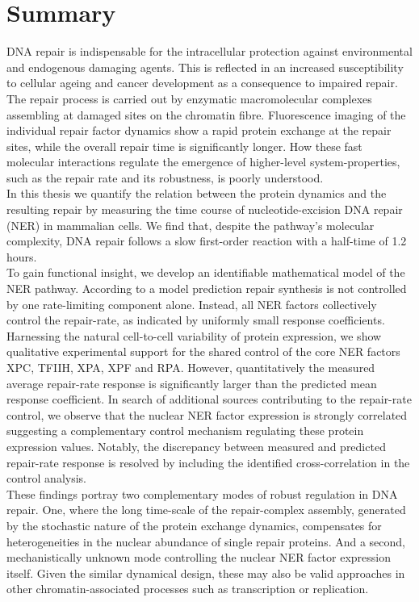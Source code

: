 \chapter*{Summary}
\thispagestyle{plain2}





DNA repair is indispensable for the intracellular protection against environmental and endogenous damaging agents. This is reflected in an increased susceptibility to cellular ageing and cancer development as a consequence to impaired repair. The repair process is carried out by enzymatic macromolecular complexes assembling at damaged sites on the chromatin fibre. Fluorescence imaging of the individual repair factor dynamics show a rapid protein exchange at the repair sites, while the overall repair time is significantly longer. How these fast molecular interactions regulate the emergence of higher-level system-properties, such as the repair rate and its robustness, is poorly understood.\\ 
In this thesis we quantify the relation between the protein dynamics and the resulting repair by measuring the time course of nucleotide-excision DNA repair (NER) in mammalian cells. We find that, despite the pathway's molecular complexity, DNA repair follows a slow first-order reaction with a half-time of 1.2 hours. \\
To gain functional insight, we develop an identifiable mathematical model of the NER pathway. According to a model prediction repair synthesis is not controlled by one rate-limiting component alone. Instead, all NER factors collectively control the repair-rate, as indicated by uniformly small response coefficients. Harnessing the natural cell-to-cell variability of protein expression, we show qualitative experimental support for the shared control of the core NER factors XPC, TFIIH, XPA, XPF and RPA. However, quantitatively the measured average repair-rate response is significantly larger than the predicted mean response coefficient. In search of additional sources contributing to the repair-rate control, we observe that the nuclear NER factor expression is strongly correlated suggesting a complementary control mechanism regulating these protein expression values. Notably, the discrepancy between measured and predicted repair-rate response is resolved by including the identified cross-correlation in the control analysis. \\ 
These findings portray two complementary modes of robust regulation in DNA repair. One, where the long time-scale of the repair-complex assembly, generated by the stochastic nature of the protein exchange dynamics, compensates for heterogeneities in the nuclear abundance of single repair proteins. And a second, mechanistically unknown mode controlling the nuclear NER factor expression itself. Given the similar dynamical design, these may also be valid approaches in other chromatin-associated processes such as transcription or replication.    



      
 


%